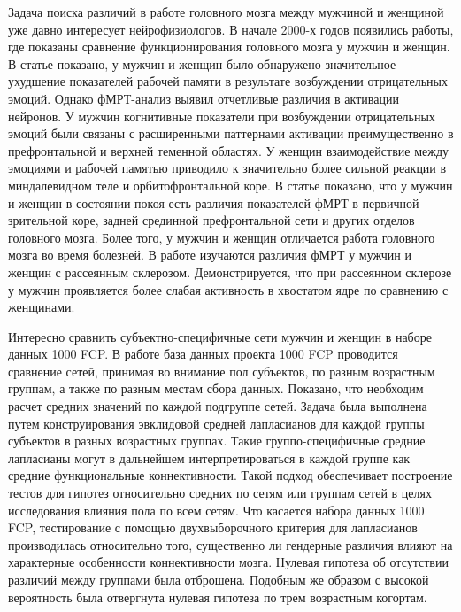 Задача поиска различий в работе головного мозга между мужчиной и женщиной уже давно интересует нейрофизиологов. В начале 2000-х годов появились работы, где показаны сравнение функционирования головного мозга у мужчин и женщин. В статье \cite{koch2007gender} показано, у мужчин и женщин было обнаружено значительное ухудшение показателей рабочей памяти в результате возбуждении отрицательных эмоций. Однако фМРТ-анализ выявил отчетливые различия в активации нейронов. У мужчин когнитивные показатели при возбуждении отрицательных эмоций были связаны с расширенными паттернами активации преимущественно в префронтальной и верхней теменной областях. У женщин взаимодействие между эмоциями и рабочей памятью приводило к значительно более сильной реакции в миндалевидном теле и орбитофронтальной коре. В статье \cite{xu2015gender} показано, что у мужчин и женщин в состоянии покоя есть различия показателей фМРТ в первичной зрительной коре, задней срединной префронтальной сети и других отделов головного мозга. Более того, у мужчин и женщин отличается работа головного мозга во время болезней. В работе \cite{zang2004regional} изучаются различия фМРТ у мужчин и женщин с рассеянным склерозом. Демонстрируется, что при рассеянном склерозе у мужчин проявляется более слабая активность в хвостатом ядре по сравнению с женщинами.

Интересно сравнить субъектно-специфичные сети мужчин и женщин в наборе данных 1000 FCP. В работе \cite{ginestet2017hypothesis} база данных проекта 1000 FCP проводится сравнение сетей, принимая во внимание пол субъектов, по разным возрастным группам, а также по разным местам сбора данных. Показано, что необходим расчет средних значений по каждой подгруппе сетей. Задача была выполнена путем конструирования эвклидовой средней лапласианов для каждой группы субъектов в разных возрастных группах. Такие группо-специфичные средние лапласианы могут в дальнейшем интерпретироваться в каждой группе как средние функциональные коннективности. Такой подход обеспечивает построение тестов для гипотез относительно средних по сетям или группам сетей в целях исследования влияния пола по всем сетям. Что касается набора данных 1000 FCP, тестирование с помощью двухвыборочного критерия для лапласианов производилась относительно того, существенно ли гендерные различия влияют на характерные особенности коннективности мозга. Нулевая гипотеза об отсутствии различий между группами была отброшена. Подобным же образом с высокой вероятность была отвергнута нулевая гипотеза по трем возрастным когортам.

